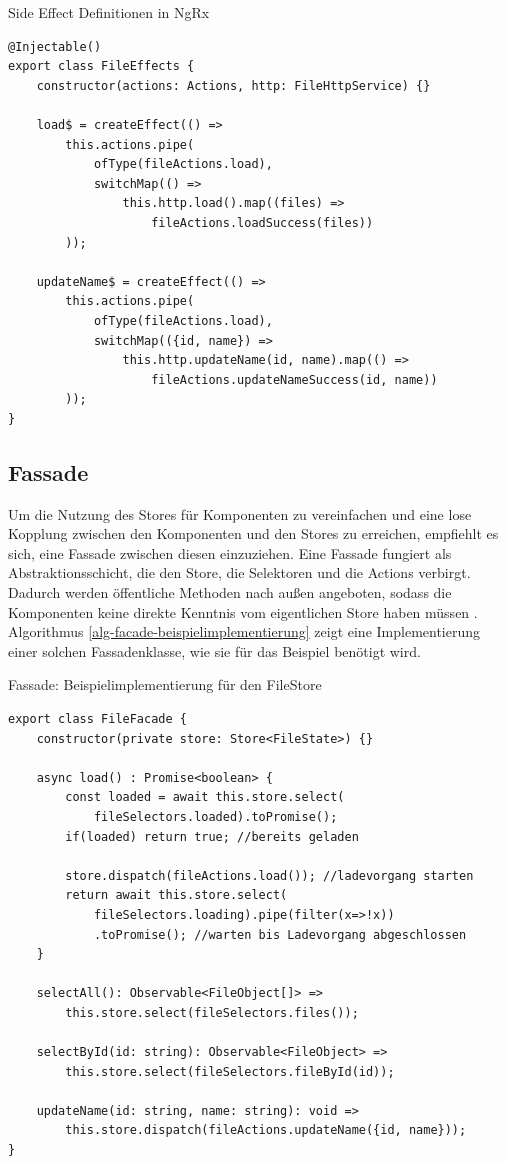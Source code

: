 \documentclass[12pt]{book}          %
\begin{document}
\begin{algorithm}
\caption{Side Effect Definitionen in NgRx}
\label{alg-side-effect-definition-in-ng-rx}
\begin{lstlisting}
@Injectable()
export class FileEffects {
    constructor(actions: Actions, http: FileHttpService) {}

    load$ = createEffect(() => 
        this.actions.pipe(
            ofType(fileActions.load),
            switchMap(() => 
                this.http.load().map((files) => 
                    fileActions.loadSuccess(files))
        ));

    updateName$ = createEffect(() => 
        this.actions.pipe(
            ofType(fileActions.load),
            switchMap(({id, name}) => 
                this.http.updateName(id, name).map(() => 
                    fileActions.updateNameSuccess(id, name))
        ));
}
\end{lstlisting}
\end{algorithm}

\subsection{Fassade}
\label{subsec-facade}

Um die Nutzung des Stores für Komponenten zu vereinfachen und eine lose Kopplung zwischen den Komponenten und den Stores zu erreichen, empfiehlt es sich, eine Fassade zwischen diesen einzuziehen. Eine Fassade fungiert als Abstraktionsschicht, die den Store, die Selektoren und die Actions verbirgt. Dadurch werden öffentliche Methoden nach außen angeboten, sodass die Komponenten keine direkte Kenntnis vom eigentlichen Store haben müssen \cite[266]{freeman_entwurfsmuster_2021}. Algorithmus \ref{alg-facade-beispielimplementierung} zeigt eine Implementierung einer solchen Fassadenklasse, wie sie für das Beispiel benötigt wird.

\begin{algorithm}
\caption{Fassade: Beispielimplementierung für den FileStore}
\label{alg-facade-beispielimplementierung}
\begin{lstlisting}
export class FileFacade {
    constructor(private store: Store<FileState>) {}

    async load() : Promise<boolean> {
        const loaded = await this.store.select(
            fileSelectors.loaded).toPromise();
        if(loaded) return true; //bereits geladen
        
        store.dispatch(fileActions.load()); //ladevorgang starten
        return await this.store.select(
            fileSelectors.loading).pipe(filter(x=>!x))
            .toPromise(); //warten bis Ladevorgang abgeschlossen
    }

    selectAll(): Observable<FileObject[]> =>
        this.store.select(fileSelectors.files());
        
    selectById(id: string): Observable<FileObject> =>
        this.store.select(fileSelectors.fileById(id));

    updateName(id: string, name: string): void =>
        this.store.dispatch(fileActions.updateName({id, name}));
}
\end{lstlisting}
\end{algorithm}
\end{document}
